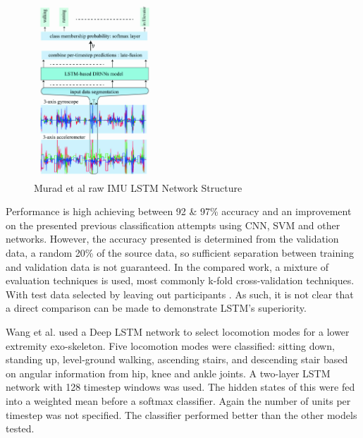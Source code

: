 \documentclass[sensors,article,submit,moreauthors,pdftex]{Definitions/mdpi}
\begin{document}
\begin{figure}[!htb]
    \centering
    \includegraphics[width=0.4\textwidth]{Figures/lstm/murad_lstm_architecture.jpg}
    \caption{Murad et al raw IMU LSTM Network Structure\cite{Murad2017}}
    \label{fig:murad_lst_network_structure}
\end{figure}

Performance is high achieving between 92 \& 97\% accuracy and an improvement on the presented previous classification attempts using CNN, SVM and other networks. However, the accuracy presented is determined from the validation data, a random 20\% of the source data, so sufficient separation between training and validation data is not guaranteed. In the compared work, a mixture of evaluation techniques is used, most commonly k-fold cross-validation techniques. With test data selected by leaving out participants \cite{Koller2018, Sprager2015}. As such, it is not clear that a direct comparison can be made to demonstrate LSTM's superiority.

Wang et al. used a Deep LSTM network to select locomotion modes for a lower extremity exo-skeleton\cite{Wang2018}. Five locomotion modes were classified: sitting down, standing up, level-ground walking, ascending stairs, and descending stair based on angular information from hip, knee and ankle joints. A two-layer LSTM network with 128 timestep windows was used. The hidden states of this were fed into a weighted mean before a softmax classifier. Again the number of units per timestep was not specified. The classifier performed better than the other models tested.
\end{document}
